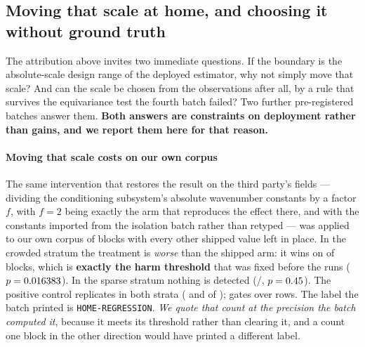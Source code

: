 \documentclass[review]{elsarticle}
\begin{document}
\subsection{Moving that scale at home, and choosing it without ground truth}
\label{sec:res_t15t16}

The attribution above invites two immediate questions. If the boundary is the
absolute-scale design range of the deployed estimator, why not simply move that
scale? And can the scale be chosen from the observations after all, by a rule that
survives the equivariance test the fourth batch failed? Two further pre-registered
batches answer them. \textbf{Both answers are constraints on deployment rather than
gains, and we report them here for that reason.}

\paragraph{Moving that scale costs on our own corpus} The same intervention that
restores the result on the third party's fields --- dividing the conditioning
subsystem's absolute wavenumber constants by a factor $f$, with $f = 2$ being exactly
the arm that reproduces the effect there, and with the constants imported from the
isolation batch rather than retyped --- was applied to our own corpus of
\TFifteenCorpusN{} blocks with every other shipped value left in place. In the
crowded stratum the treatment is \emph{worse} than the shipped arm: it wins on
\TFifteenCrowdedWin{} of \TFifteenN{} blocks, which is \textbf{exactly the harm
threshold} \TFifteenHurtThresh{} that was fixed before the runs
($p = 0.016383{}$). In the sparse stratum nothing is detected
(\TFifteenSparseWin{}/\TFifteenN{}, $p = 0.45{}$). The positive control
replicates in both strata (\TFifteenCtrlWin{} and \TFifteenCtrlSparseWin{} of
\TFifteenN{}); gates \TFifteenGates{} over \TFifteenRows{} rows. The label the batch
printed is \texttt{HOME-REGRESSION}. \emph{We quote that count at the precision the
batch computed it}, because it meets its threshold rather than clearing it, and a
count one block in the other direction would have printed a different label.
\end{document}
